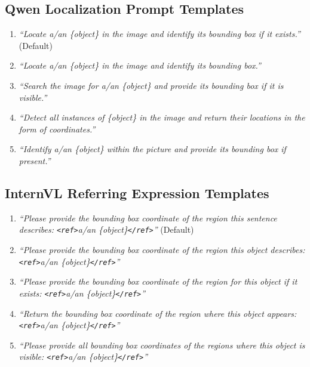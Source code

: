 \documentclass[12pt,a4paper]{article}
\begin{document}
\subsection{Qwen Localization Prompt Templates}
\begin{enumerate}
\item \textit{``Locate a/an \{object\} in the image and identify its bounding box if it exists.''} (Default)
\item \textit{``Locate a/an \{object\} in the image and identify its bounding box.''}
\item \textit{``Search the image for a/an \{object\} and provide its bounding box if it is visible.''}
\item \textit{``Detect all instances of \{object\} in the image and return their locations in the form of coordinates.''}
\item \textit{``Identify a/an \{object\} within the picture and provide its bounding box if present.''}
\end{enumerate}

\subsection{InternVL Referring Expression Templates}
\begin{enumerate}
\item \textit{``Please provide the bounding box coordinate of the region this sentence describes: \texttt{\textless ref\textgreater}a/an \{object\}\texttt{\textless/ref\textgreater}''} (Default)
\item \textit{``Please provide the bounding box coordinate of the region this object describes: \texttt{\textless ref\textgreater}a/an \{object\}\texttt{\textless/ref\textgreater}''}
\item \textit{``Please provide the bounding box coordinate of the region for this object if it exists: \texttt{\textless ref\textgreater}a/an \{object\}\texttt{\textless/ref\textgreater}''}
\item \textit{``Return the bounding box coordinate of the region where this object appears: \texttt{\textless ref\textgreater}a/an \{object\}\texttt{\textless/ref\textgreater}''}
\item \textit{``Please provide all bounding box coordinates of the regions where this object is visible: \texttt{\textless ref\textgreater}a/an \{object\}\texttt{\textless/ref\textgreater}''}
\end{enumerate}
\end{document}
